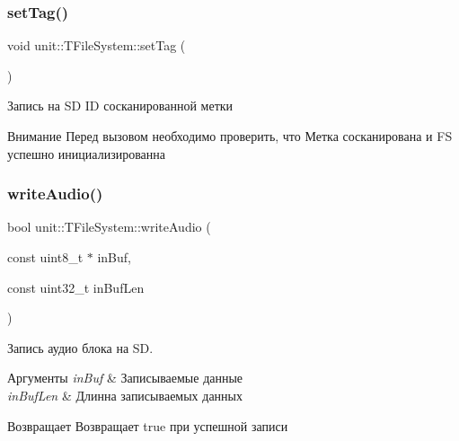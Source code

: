 \subsubsection{\texorpdfstring{set\+Tag()}{setTag()}}
{\footnotesize\ttfamily void unit\+::\+T\+File\+System\+::set\+Tag (\begin{DoxyParamCaption}{ }\end{DoxyParamCaption})}



Запись на SD ID сосканированной метки 

\begin{DoxyAttention}{Внимание}
Перед вызовом необходимо проверить, что Метка сосканирована и FS успешно инициализированна 
\end{DoxyAttention}
\mbox{\label{classunit_1_1_t_file_system_a01199e9b6421790c5954dbc69ef84ae2}} 
\subsubsection{\texorpdfstring{write\+Audio()}{writeAudio()}}
{\footnotesize\ttfamily bool unit\+::\+T\+File\+System\+::write\+Audio (\begin{DoxyParamCaption}\item[{const uint8\+\_\+t $\ast$}]{in\+Buf,  }\item[{const uint32\+\_\+t}]{in\+Buf\+Len }\end{DoxyParamCaption})}



Запись аудио блока на SD. 






\begin{DoxyParams}{Аргументы}
{\em in\+Buf} & Записываемые данные \\
\hline
{\em in\+Buf\+Len} & Длинна записываемых данных \\
\hline
\end{DoxyParams}
\begin{DoxyReturn}{Возвращает}
Возвращает true при успешной записи 
\end{DoxyReturn}
\mbox{\label{classunit_1_1_t_file_system_aacd7aae1827432b04c06b9a1d440b949}} 
